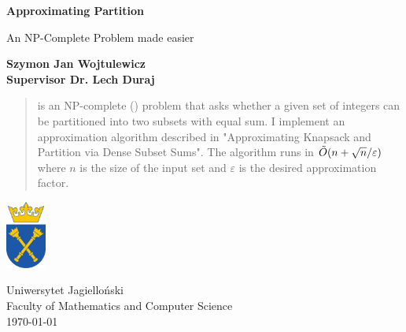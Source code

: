 \begin{titlepage}
    \begin{center}
        \vspace*{1cm}
        
        \Huge
        \textbf{Approximating Partition}
        
        \vspace{0.5cm}
        \LARGE
        An NP-Complete Problem made easier
        
        \vspace{1.5cm}
        
        \small
        \textbf{Szymon Jan Wojtulewicz} \\
        \small
        \textbf{Supervisor Dr. Lech Duraj}

        \vspace{2cm}

        \begin{abstract}
            \Partition is an NP-complete (\cite{eshard}) problem that asks whether a given set of integers can be partitioned into two subsets with equal sum. I implement an approximation algorithm described in "Approximating Knapsack and Partition via Dense Subset Sums"\cite{deng}. The algorithm runs in $\tilde{O}(n + \sqrt{n}/\varepsilon)$ where $n$ is the size of the input set and $\varepsilon$ is the desired approximation factor.
        \end{abstract}
        
        
        \vfill
        
        
        \includegraphics[width=0.1\textwidth]{university_logo.png}
        
        \vspace{0.8cm}
        \Large
        Uniwersytet Jagielloński\\
        Faculty of Mathematics and Computer Science\\
        \today
        
    \end{center}
\end{titlepage}
